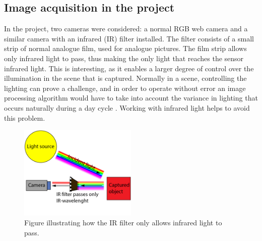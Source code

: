 
\subsection{Image acquisition in the project}
In the project, two cameras were considered: a normal RGB web camera and a similar camera with an infrared (IR) filter installed. The filter consists of a small strip of normal analogue film, used for analogue pictures. The film strip allows only infrared light to pass, thus making the only light that reaches the sensor infrared light. This is interesting, as it enables a larger degree of control over the illumination in the scene that is captured. Normally in a scene, controlling the lighting can prove a challenge, and in order to operate without error an image processing algorithm would have to take into account the variance in lighting that occurs naturally during a day cycle \citep{ip_book}. Working with infrared light helps to avoid this problem.


\begin{figure}[htbp] 
\centering 
\includegraphics[width=0.5\textwidth]{Pictures/Theory/IR_filter.png} 
\caption{Figure illustrating how the IR filter only allows infrared light to pass.} 
\label{fig:ir_filter} 
\end{figure}





